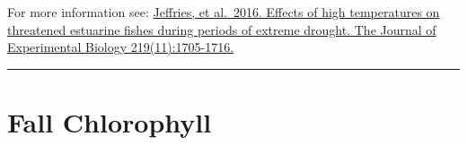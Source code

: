 \documentclass[
]{book}
\begin{document}
\begin{disclaimer}
For more information see:
\href{https://jeb.biologists.org/content/219/11/1705.short}{Jeffries, et
al.~2016. Effects of high temperatures on threatened estuarine fishes
during periods of extreme drought. The Journal of Experimental Biology
219(11):1705-1716.}
\end{disclaimer}

\begin{center}\rule{0.5\linewidth}{0.5pt}\end{center}

\hypertarget{fall-chlorophyll}{%
\section{Fall Chlorophyll}\label{fall-chlorophyll}}
\end{document}
